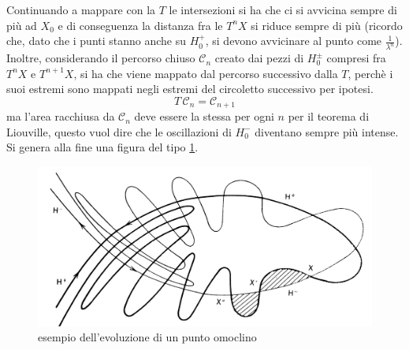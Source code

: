 \documentclass[a4paper,12pt]{article}
\theoremstyle{plain}
\theoremstyle{definition}
\newcommand{\Op}[1]{\mathcal{#1}}
\newcommand{\f}[2]{\frac{#1}{#2}}
\theoremstyle{remark}
\begin{document}
 Continuando a mappare con la $T$ le intersezioni si ha che ci si avvicina sempre di più ad $X_0$ e di conseguenza la distanza fra le $T^n X$ si riduce sempre di più (ricordo che, dato che i punti stanno anche su $H_0^+$, si devono avvicinare al punto come $\f{1}{\lambda^n}$). \\
Inoltre, considerando il percorso chiuso $\Op{C}_n$ creato dai pezzi di $H_0^\pm$ compresi fra $T^n X$ e $T^{n+1}X$, si ha che viene mappato dal percorso successivo dalla $T$, perchè i suoi estremi sono mappati negli estremi  del circoletto successivo per ipotesi.
\[T \,\Op{C}_n=\Op{C}_{n+1}\] 
ma l'area racchiusa da $\Op{C}_n$ deve essere la stessa per ogni $n$ per il teorema di Liouville, questo vuol dire che le oscillazioni di $H_0^-$ diventano sempre più intense. Si genera alla fine una figura del tipo \ref{osc2}.
\begin{figure}[h]
	\centering
\includegraphics[scale=0.3]{Tabor4}
\caption{esempio dell'evoluzione di un punto omoclino}
\label{osc2}

\end{figure}
\end{document}
